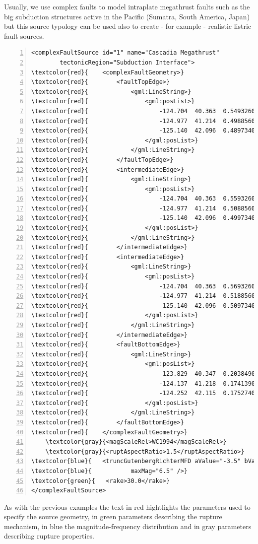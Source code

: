 Usually, we use complex faults to model intraplate megathrust faults such 
as the big subduction structures active in the Pacific (Sumatra, South 
America, Japan) but this source typology can be used also to create - for
example - realistic listric fault sources.
%
\begin{Verbatim}[frame=single, commandchars=\\\{\}, fontsize=\footnotesize,
    numbers=left, numbersep=2pt]
<complexFaultSource id="1" name="Cascadia Megathrust" 
		tectonicRegion="Subduction Interface">
\textcolor{red}{    <complexFaultGeometry>}
\textcolor{red}{        <faultTopEdge>}
\textcolor{red}{            <gml:LineString>}
\textcolor{red}{                <gml:posList>}
\textcolor{red}{                    -124.704  40.363  0.5493260E+01}
\textcolor{red}{                    -124.977  41.214  0.4988560E+01}
\textcolor{red}{                    -125.140  42.096  0.4897340E+01}
\textcolor{red}{                </gml:posList>}
\textcolor{red}{            </gml:LineString>}
\textcolor{red}{        </faultTopEdge>}
\textcolor{red}{        <intermediateEdge>}
\textcolor{red}{            <gml:LineString>}
\textcolor{red}{                <gml:posList>}
\textcolor{red}{                    -124.704  40.363  0.5593260E+01}
\textcolor{red}{                    -124.977  41.214  0.5088560E+01}
\textcolor{red}{                    -125.140  42.096  0.4997340E+01}
\textcolor{red}{                </gml:posList>}
\textcolor{red}{            </gml:LineString>}
\textcolor{red}{        </intermediateEdge>}
\textcolor{red}{        <intermediateEdge>}
\textcolor{red}{            <gml:LineString>}
\textcolor{red}{                <gml:posList>}
\textcolor{red}{                    -124.704  40.363  0.5693260E+01}
\textcolor{red}{                    -124.977  41.214  0.5188560E+01}
\textcolor{red}{                    -125.140  42.096  0.5097340E+01}
\textcolor{red}{                </gml:posList>}
\textcolor{red}{            </gml:LineString>}
\textcolor{red}{        </intermediateEdge>}
\textcolor{red}{        <faultBottomEdge>}
\textcolor{red}{            <gml:LineString>}
\textcolor{red}{                <gml:posList>}
\textcolor{red}{                    -123.829  40.347  0.2038490E+02}
\textcolor{red}{                    -124.137  41.218  0.1741390E+02}
\textcolor{red}{                    -124.252  42.115  0.1752740E+02}
\textcolor{red}{                </gml:posList>}
\textcolor{red}{            </gml:LineString>}
\textcolor{red}{        </faultBottomEdge>}
\textcolor{red}{    </complexFaultGeometry>}
    \textcolor{gray}{<magScaleRel>WC1994</magScaleRel>}
    \textcolor{gray}{<ruptAspectRatio>1.5</ruptAspectRatio>}
\textcolor{blue}{   <truncGutenbergRichterMFD aValue="-3.5" bValue="1.0" minMag="5.0" }
\textcolor{blue}{			maxMag="6.5" />}
\textcolor{green}{   <rake>30.0</rake>}
</complexFaultSource>
\end{Verbatim}
As with the previous examples the text in red hightlights the parameters
used to specify the source geometry, in green parameters describing the 
rupture mechanism, in blue the magnitude-frequency distribution and in 
gray parameters describing rupture properties. 
%
